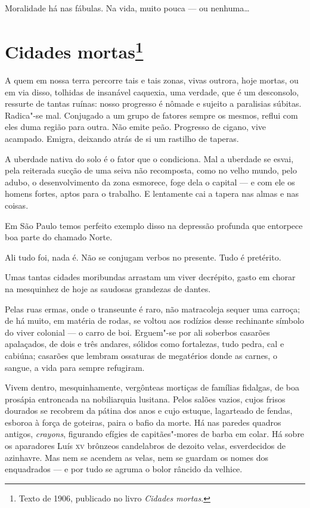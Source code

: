 Moralidade há nas fábulas. Na vida, muito pouca --- ou nenhuma\ldots{}

\chapter{Cidades mortas\footnote[*]{Texto de 1906, publicado no livro \emph{Cidades mortas}.}}

A quem em nossa terra percorre tais e tais zonas, vivas outrora, hoje
mortas, ou em via disso, tolhidas de insanável caquexia, uma verdade,
que é um desconsolo, ressurte de tantas ruínas: nosso progresso é nômade
e sujeito a paralisias súbitas. Radica"-se mal. Conjugado a um grupo de
fatores sempre os mesmos, reflui com eles duma região para outra. Não
emite peão. Progresso de cigano, vive acampado. Emigra, deixando atrás
de si um rastilho de taperas.

A uberdade nativa do solo é o fator que o condiciona. Mal a uberdade se
esvai, pela reiterada sucção de uma seiva não recomposta, como no velho
mundo, pelo adubo, o desenvolvimento da zona esmorece, foge dela o
capital --- e com ele os homens fortes, aptos para o trabalho. E
lentamente cai a tapera nas almas e nas coisas.

Em São Paulo temos perfeito exemplo disso na depressão profunda que
entorpece boa parte do chamado Norte.

Ali tudo foi, nada é. Não se conjugam verbos no presente. Tudo é
pretérito.

Umas tantas cidades moribundas arrastam um viver decrépito, gasto em
chorar na mesquinhez de hoje as saudosas grandezas de dantes.

Pelas ruas ermas, onde o transeunte é raro, não matracoleja sequer uma
carroça; de há muito, em matéria de rodas, se voltou aos rodízios desse
rechinante símbolo do viver colonial --- o carro de boi. Erguem"-se por
ali soberbos casarões apalaçados, de dois e três andares, sólidos como
fortalezas, tudo pedra, cal e cabiúna; casarões que lembram ossaturas de
megatérios donde as carnes, o sangue, a vida para sempre refugiram.

Vivem dentro, mesquinhamente, vergônteas mortiças de famílias fidalgas,
de boa prosápia entroncada na nobiliarquia lusitana. Pelos salões
vazios, cujos frisos dourados se recobrem da pátina dos anos e cujo
estuque, lagarteado de fendas, esboroa à força de goteiras, paira o
bafio da morte. Há nas paredes quadros antigos, \emph{crayons},
figurando efígies de capitães"-mores de barba em colar. Há sobre os
aparadores Luís \textsc{xv} brônzeos candelabros de dezoito velas, esverdecidos
de azinhavre. Mas nem se acendem as velas, nem se guardam os nomes dos
enquadrados --- e por tudo se agruma o bolor râncido da velhice.

